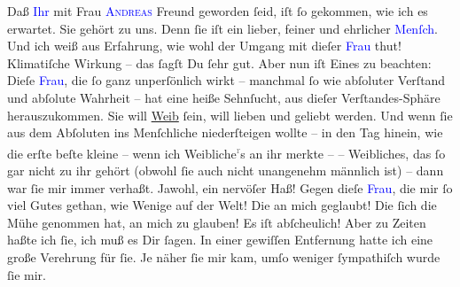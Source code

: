 \pstart
           Daß \textcolor{blue}{Ihr}{}\ledrightnote{{$\rightarrow$}\textcolor{blue}{Richard Beer-Hofmann}} mit Frau \textsc{\textcolor{blue}{Andreas}{}\ledrightnote{\textcolor{blue}{Lou Andreas-Salomé}}} Freund geworden ſeid, iſt ſo gekommen, wie ich es erwartet. Sie gehört zu uns.
               Denn ſie iſt ein lieber, feiner und ehrlicher \textcolor{blue}{Menſch}{}\ledrightnote{{$\rightarrow$}\textcolor{blue}{Lou Andreas-Salomé}}. Und ich weiß aus Erfahrung, wie wohl der Umgang mit
               dieſer \textcolor{blue}{Frau}{}\ledrightnote{{$\rightarrow$}\textcolor{blue}{Lou Andreas-Salomé}} thut!
               Klimatiſche Wirkung – das ſagſt Du ſehr gut. Aber nun iſt Eines zu beachten: {\pb}Dieſe \textcolor{blue}{Frau}{}\ledrightnote{{$\rightarrow$}\textcolor{blue}{Lou Andreas-Salomé}}, die ſo ganz unperſönlich wirkt – manchmal ſo wie
               abſoluter Verſtand und abſolute Wahrheit – hat eine heiße Sehnſucht, aus dieſer
               Verſtandes-Sphäre herauszukommen. Sie will \uline{Weib} ſein,
               will lieben und geliebt werden. Und wenn ſie aus dem Abſoluten ins Menſchliche
               niederſteigen wollte – in den Tag hinein, wie  die
               erſte beſte kleine {\pb}\label{K_L02735-55v}\label{K_L02735-55h} – wenn ich Weibliche\substVorne{}\textsuperscript{\textcolor{gray}{r}}\substDazwischen{}s\substHinten{} an ihr merkte – \label{K_L02735-2v}\label{K_L02735-2h} – Weibliches, das ſo gar nicht zu ihr gehört (obwohl ſie
               auch nicht unangenehm männlich ist) – dann war ſie 
               mir immer verhaßt. Jawohl, ein nervöſer Haß! Gegen dieſe \textcolor{blue}{Frau}{}\ledrightnote{{$\rightarrow$}\textcolor{blue}{Lou Andreas-Salomé}}, die mir ſo viel Gutes gethan, wie
               Wenige auf  der Welt! Die an mich geglaubt! Die ſich
               die Mühe genommen hat, an {\pb}mich zu glauben! Es iſt
               abſcheulich! Aber zu Zeiten haßte ich ſie, ich muß es Dir ſagen. In einer gewiſſen
               Entfernung  hatte ich eine große Verehrung für
               ſie. Je näher ſie mir kam, umſo weniger ſympathiſch wurde ſie mir.\pend
           
